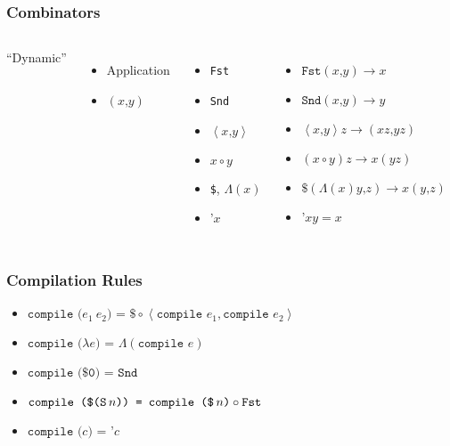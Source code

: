\documentclass[aspectratio=169, draft]{beamer}
\begin{document}
\begin{frame}
	\frametitle{Combinators}
	\begin{columns}[T]
		``Dynamic''
		\begin{itemize}
			\item<1-> Application
			\item<2-> $\left(x\texttt{,}y\right)$
		\end{itemize}
		\begin{itemize}
			\item<4-> \texttt{Fst}
			\item<4-> \texttt{Snd}
			\item<5-> $\left<x\texttt{,}y\right>$
			\item<6-> $x \circ y$
			\item<7-> \texttt{\$}, $\Lambda\left(x\right)$
			\item<8-> $\texttt{'}x$
		\end{itemize}

		\vspace{2.1cm}
		\begin{itemize}
			\item<4-> $\texttt{Fst}\left(x\texttt{,}y\right)\rightarrow x$
			\item<4-> $\texttt{Snd}\left(x\texttt{,}y\right)\rightarrow y$
			\item<5-> $\left<x\texttt{,}y\right>z\rightarrow\left(xz\texttt{,}yz\right)$
			\item<6-> $\left(x \circ y\right)z\rightarrow x\left(yz\right)$
			\item<7-> $\texttt{\$}\left(\Lambda\left(x\right)y\texttt{,}z\right)\rightarrow x\left(y\texttt{,}z\right)$
			\item<8-> $\texttt{'}xy = x$
		\end{itemize}
	\end{columns}
\end{frame}

\begin{frame}
	\frametitle{Compilation Rules}
	\begin{itemize}[<+->]
		\item $\texttt{compile (}e_1\ e_2\texttt{) = }\texttt{\$}\circ\left<\texttt{compile }e_1, \texttt{compile }e_2\right>$
		\item $\texttt{compile (}\lambda e\texttt{) = }\Lambda\left(\texttt{compile }e\right)$
		\item $\texttt{compile (\$0) = Snd}$
		\item $\texttt{compile (\$(S\,}n\texttt{)) = compile (\$\,}n\texttt{)}\circ\texttt{Fst}$
		\item $\texttt{compile (}c\texttt{) = '}c$
	\end{itemize}
\end{frame}
\end{document}
